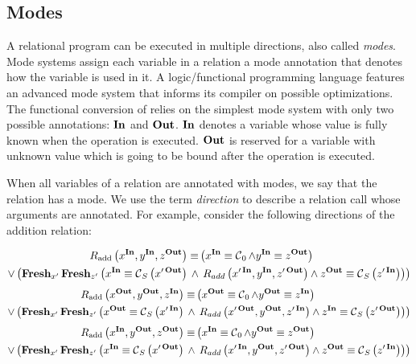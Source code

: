 \subsection{Modes}

A relational program can be executed in multiple directions, also called \emph{modes}. 
Mode systems assign each variable in a relation a mode annotation that denotes how the variable is used in it. 
A logic/functional programming language \merc features an advanced mode system that informs its compiler on possible optimizations. 
The functional conversion of \mk relies on the simplest mode system with only two possible annotations: $\In$ and $\Out$. 
$\In$ denotes a variable whose value is fully known when the operation is executed. 
$\Out$ is reserved for a variable with unknown value which is going to be bound after the operation is executed. 

When all variables of a relation are annotated with modes, we say that the relation has a mode. 
We use the term \emph{direction} to describe a relation call whose arguments are annotated. 
For example, consider the following directions of the addition relation:

\begin{equation*}
    \begin{split}
        R_{\text{add}}\left( x^{\In}, y^{\In}, z^{\Out} \right) \equiv 
        &\left(  x^{\In} \equiv \Cons_0  \land y^{\In} \equiv z^{\Out} \right) \\
\lor \left( \Fresh_{x'}\Fresh_{z'} \left(x^{\In} \equiv \Cons_{S}\left( x'^{\Out} \right)\right.\right.  \land& \left.\left. R_{add}\left(x'^{\In}, y^{\In}, z'^{\Out}\right) \land z^{\Out} \equiv \Cons_{S}\left( z'^{\In} \right) \right)\right)
    \end{split}
\end{equation*}
\begin{equation*}
    \begin{split}
        R_{\text{add}}\left( x^{\Out}, y^{\Out}, z^{\In} \right) \equiv 
        &\left(  x^{\Out} \equiv \Cons_0  \land y^{\Out} \equiv z^{\In} \right) \\
\lor \left( \Fresh_{x'}\Fresh_{z'} \left(x^{\Out} \equiv \Cons_{S}\left( x'^{\In} \right)\right.\right.  \land& \left.\left. R_{add}\left(x'^{\Out}, y^{\Out}, z'^{\In}\right) \land z^{\In} \equiv \Cons_{S}\left( z'^{\Out} \right) \right)\right)
    \end{split}
\end{equation*}
\begin{equation*}
    \begin{split}
        R_{\text{add}}\left( x^{\In}, y^{\Out}, z^{\Out} \right) \equiv 
        &\left(  x^{\In} \equiv \Cons_0  \land y^{\Out} \equiv z^{\Out} \right) \\
\lor \left( \Fresh_{x'}\Fresh_{z'} \left(x^{\In} \equiv \Cons_{S}\left( x'^{\Out} \right)\right.\right.  \land& \left.\left. R_{add}\left(x'^{\In}, y^{\Out}, z'^{\Out}\right) \land z^{\Out} \equiv \Cons_{S}\left( z'^{\In} \right) \right)\right)
    \end{split}
\end{equation*}

